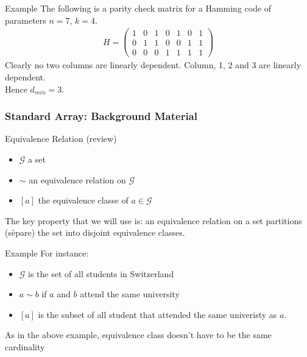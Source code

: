 \begin{parag}{Example}
    The following is a parity check matrix for a Hamming code of parameters $n =  7$, $k =  4$.
    \begin{align*} 
	    H =  \begin{pmatrix} 1 & 0 & 1 & 0 & 1 & 0 & 1 \\ 0 & 1 & 1 & 0 & 0 & 1 & 1 \\ 0 & 0 & 0 & 1 & 1 & 1 & 1 \end{pmatrix} 
    \end{align*}
    Clearly no two columns are linearly dependent. Column, 1, 2 and $3$ are linearly dependent.\\
    Hence $d_{min} =  3$.
\end{parag}

\subsubsection{Standard Array: Background Material}

\begin{parag}{Equivalence Relation (review)}
    \begin{itemize}
	    \item $\mathcal{G}$ a set
	    \item $\sim$ an equivalence relation on $\mathcal{G}$
	    \item $\left[a\right]$ the equivalence classe of $a \in \mathcal{G}$
    \end{itemize}
    The key property that we will use is: an equivalence relation on a set partitions (sèpare) the set into disjoint equivalence classes.
    
    \begin{subparag}{Example}
        For instance:
	\begin{itemize}
		\item $\mathcal{G}$ is the set of all students in Switzerland
		\item $a \sim b$ if $a$ and $b$ attend the same university
		\item $\left[a\right]$ is the subset of all student that attended the same univeristy as $a$.
	\end{itemize}
	\begin{framedremark}
	As in the above example, equivalence class doesn't have to be the same cardinality
	\end{framedremark}
    \end{subparag}
\end{parag}

